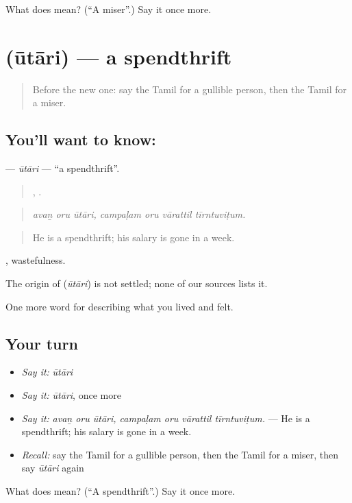 \begin{tcolorbox}[breakable,colback=teal!4,colframe=teal!35!black,title={Before you move on}]
What does  mean? (\textquotedblleft{}A miser\textquotedblright{}.) Say it once more.
\end{tcolorbox}
\section[\texorpdfstring{\ta{ஊதாரி} (ūtāri)}{ஊதாரி (ūtāri)}]{ (ūtāri) — a spendthrift}

\label{lesson:TA-C472-utari}



\begin{quote}
Before the new one: say the Tamil for a gullible person, then the Tamil for a miser.
\end{quote}

\subsection*{You'll want to know: }
\textbf{} — \emph{ūtāri} — \textquotedblleft{}a spendthrift\textquotedblright{}.

\begin{quote}
  ,    .
\end{quote}

\begin{quote}
\emph{avaṉ oru ūtāri, campaḷam oru vārattil tīrntuviṭum.}
\end{quote}

\begin{quote}
He is a spendthrift; his salary is gone in a week.
\end{quote}

, wastefulness.

\begin{cousinweb}
The origin of \textbf{} (\emph{ūtāri}) is not settled; none of our sources lists it.
\end{cousinweb}

\begin{grammarlens}[title={What you've built}]
One more word for describing what you lived and felt.
\end{grammarlens}

\subsection*{Your turn}
\begin{itemize}
\raggedright
  \item \emph{Say it:} \emph{ūtāri}
  \item \emph{Say it:} \emph{ūtāri}, once more
  \item \emph{Say it:} \emph{avaṉ oru ūtāri, campaḷam oru vārattil tīrntuviṭum.} — He is a spendthrift; his salary is gone in a week.
  \item \emph{Recall:} say the Tamil for a gullible person, then the Tamil for a miser, then say \emph{ūtāri} again
\end{itemize}

\begin{tcolorbox}[breakable,colback=teal!4,colframe=teal!35!black,title={Before you move on}]
What does  mean? (\textquotedblleft{}A spendthrift\textquotedblright{}.) Say it once more.
\end{tcolorbox}
